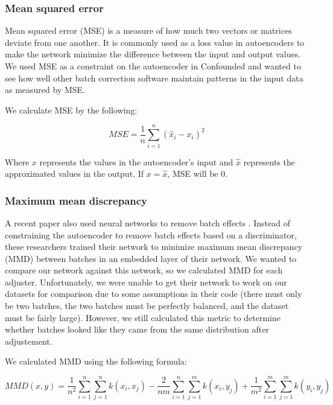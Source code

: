 \documentclass[notitlepage]{article}
\begin{document}
\subsubsection{Mean squared error}

Mean squared error (MSE) is a measure of how much two vectors or matrices deviate from one another.
It is commonly used as a loss value in autoencoders to make the network minimize the difference between the input and output values.
We used MSE as a constraint on the autoencoder in Confounded and wanted to see how well other batch correction software maintain patterns in the input data as measured by MSE.

We calculate MSE by the following:

\begin{equation}
	\label{mse}
	MSE = \frac{1}{n}\sum_{i=1}^n{(\hat{x}_i - x_i)^2}
\end{equation}

Where $x$ represents the values in the autoencoder's input and $\hat{x}$ represents the approximated values in the output.
If $x = \hat{x}$, MSE will be 0.

\subsubsection{Maximum mean discrepancy} \label{section:mmd}

A recent paper also used neural networks to remove batch effects \cite{shaham_removal_2017}.
Instead of constraining the autoencoder to remove batch effects based on a discriminator, these researchers trained their network to minimize maximum mean discrepancy (MMD) between batches in an embedded layer of their network.
We wanted to compare our network against this network, so we calculated MMD for each adjuster.
Unfortunately, we were unable to get their network to work on our datasets for comparison due to some assumptions in their code (there must only be two batches, the two batches must be perfectly balanced, and the dataset must be fairly large).
However, we still calculated this metric to determine whether batches looked like they came from the same distribution after adjustement.

We calculated MMD using the following formula:

\begin{equation}
	\label{mmd}
	MMD(x, y) = \frac{1}{n^2}\sum_{i=1}^n{\sum_{j=1}^n{k(x_i, x_j)}} - \frac{2}{nm}\sum_{i=1}^n{\sum_{j=1}^m{k(x_i, y_j)}} + \frac{1}{m^2}\sum_{i=1}^m{\sum_{j=1}^m{k(y_i, y_j)}}
\end{equation}
\end{document}
